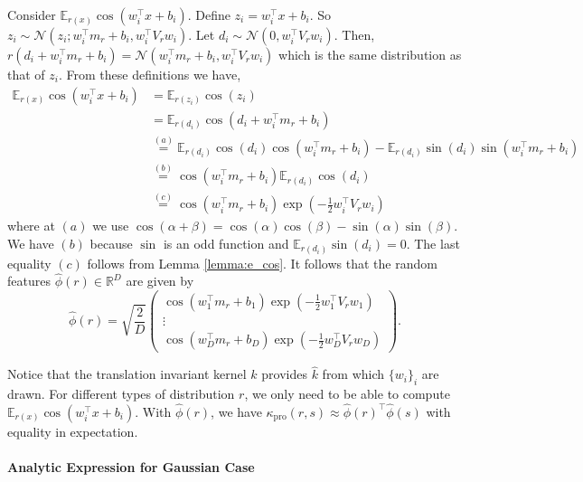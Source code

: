 \documentclass[english]{article}
\theoremstyle{plain}
\theoremstyle{plain}
\begin{document}
Consider $\mathbb{E}_{r(x)}\cos\left(w_{i}^{\top}x+b_{i}\right)$.
Define $z_{i}=w_{i}^{\top}x+b_{i}$. So $z_{i}\sim\mathcal{N}(z_{i};w_{i}^{\top}m_{r}+b_{i},w_{i}^{\top}V_{r}w_{i})$.
Let $d_{i}\sim\mathcal{N}(0,w_{i}^{\top}V_{r}w_{i})$. Then, $r(d_{i}+w_{i}^{\top}m_{r}+b_{i})=\mathcal{N}(w_{i}^{\top}m_{r}+b_{i},w_{i}^{\top}V_{r}w_{i})$
which is the same distribution as that of $z_{i}$. From these definitions
we have,
%
\begin{align*}
\mathbb{E}_{r(x)}\cos\left(w_{i}^{\top}x+b_{i}\right) & =\mathbb{E}_{r(z_{i})}\cos(z_{i})\\
 & =\mathbb{E}_{r(d_{i})}\cos\left(d_{i}+w_{i}^{\top}m_{r}+b_{i}\right)\\
 & \overset{(a)}
 {=}\mathbb{E}_{r(d_{i})}\cos(d_{i})\cos(w_{i}^{\top}m_{r}+b_{i})-\mathbb{E}_{r(d_{i})}\sin(d_{i})\sin
 (w_{i}^{\top}m_{r}+b_{i})\\
 & \overset{(b)}{=}\cos(w_{i}^{\top}m_{r}+b_{i})\mathbb{E}_{r(d_{i})}\cos(d_{i})\\
 & \overset{(c)}{=}\cos(w_{i}^{\top}m_{r}+b_{i})\exp\left(-\frac{1}{2}w_{i}^{\top}V_{r}w_{i}\right)
\end{align*}
where at $(a)$ we use $\cos(\alpha+\beta)=\cos(\alpha)\cos(\beta)-\sin(\alpha)\sin(\beta)$.
We have $(b)$ because $\sin$ is an odd function and $\mathbb{E}_{r(d_{i})}\sin(d_{i})=0$.
The last equality $(c)$ follows from Lemma \ref{lemma:e_cos}. It
follows that the random features $\hat{\phi}(r)\in\mathbb{R}^{D}$
are given by
\[
\hat{\phi}(r)=\sqrt{\frac{2}{D}}\left(\begin{array}{c}
\cos(w_{1}^{\top}m_{r}+b_{1})\exp\left(-\frac{1}{2}w_{1}^{\top}V_{r}w_{1}\right)\\
\vdots\\
\cos(w_{D}^{\top}m_{r}+b_{D})\exp\left(-\frac{1}{2}w_{D}^{\top}V_{r}w_{D}\right)
\end{array}\right).
\]


Notice that the translation invariant kernel $k$
provides $\hat{k}$ from which $\{w_{i}\}_{i}$ are
drawn. For different types of distribution $r$, we only need to
be able to compute $\mathbb{E}_{r(x)}\cos\left(w_{i}^{\top}x+b_{i}\right)$.
With $\hat{\phi}(r)$, we have $\kappa_\text{pro}(r, s)\approx\hat{\phi}(r)^{\top}\hat{\phi}(s)$
with equality in expectation.


\paragraph{Analytic Expression for Gaussian Case}
\end{document}
